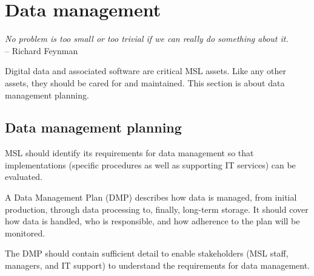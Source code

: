 \section{Data management}
\begin{flushright}
\textit{No problem is too small or too trivial if we can really do something about it.} \\
-- Richard Feynman 
\end{flushright}


Digital data and associated software are critical MSL assets. Like any other assets, they should be cared for and maintained. This section is about data management planning. 

\subsection{Data management planning}
MSL should identify its requirements for data management so that implementations (specific procedures as well as supporting IT services) can be evaluated. 

A Data Management Plan (DMP) describes how data is managed, from initial production, through data processing to, finally, long-term storage. It should cover how data is handled, who is responsible, and how adherence to the plan will be monitored.

The DMP should contain sufficient detail to enable stakeholders (MSL staff, managers, and IT support) to understand the requirements for data management.

